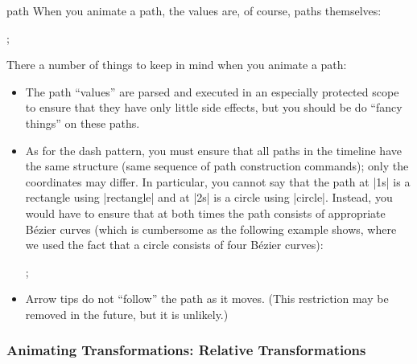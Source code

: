 \begin{tikzanimateattribute}{path}
  When you animate a path, the values are, of course, paths themselves:
\begin{codeexample}[animation list={0.5,1,1.5,2}]
\tikz {}; 
\end{codeexample}
  There a number of things to keep in mind when you animate a path:
  \begin{itemize}
  \item The path ``values'' are parsed and executed in an especially
    protected scope to ensure that they have only little side effects,
    but you should be do ``fancy things'' on these paths.
  \item 
    As for the dash pattern, you must ensure that all paths in the
    timeline have the same structure (same sequence of path construction
    commands); only the coordinates may differ. In particular, you
    cannot say that the path at |1s| is a rectangle using
    |rectangle| and at |2s| is a circle using
    |circle|. Instead, you would have to ensure that at both
    times the path consists of appropriate Bézier curves (which is
    cumbersome as the following example shows, where we used the fact
    that a circle consists of four Bézier curves):
\begin{codeexample}[animation list={0.5,1,1.5,2}]
\tikz {}; 
\end{codeexample}
  \item
    Arrow tips do not ``follow'' the path as it moves. (This
    restriction may be removed in the future, but it is unlikely.)
  \end{itemize}
\end{tikzanimateattribute}



\subsubsection{Animating Transformations: Relative Transformations}

